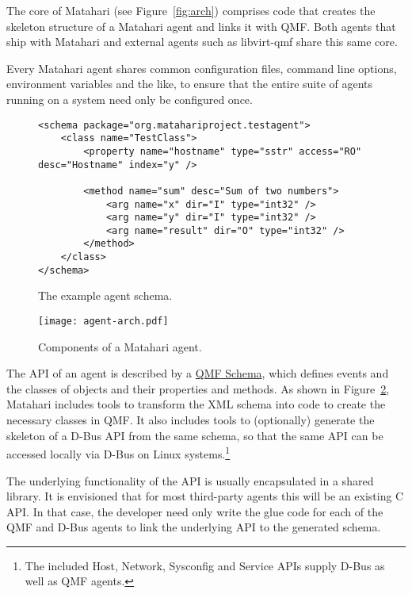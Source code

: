 \documentclass{tufte-handout}
\begin{document}
The core of Matahari (see Figure~\ref{fig:arch}) comprises code that creates the skeleton structure of a Matahari agent and links it with QMF. Both agents that ship with Matahari and external agents such as libvirt-qmf share this same core.

Every Matahari agent shares common configuration files, command line options, environment variables and the like, to ensure that the entire suite of agents running on a system need only be configured once.

\begin{figure}[h]
\begin{Verbatim}
<schema package="org.matahariproject.testagent">
    <class name="TestClass">
        <property name="hostname" type="sstr" access="RO" desc="Hostname" index="y" />

        <method name="sum" desc="Sum of two numbers">
            <arg name="x" dir="I" type="int32" />
            <arg name="y" dir="I" type="int32" />
            <arg name="result" dir="O" type="int32" />
        </method>
    </class>
</schema>
\end{Verbatim}
\caption{The example agent schema.}
\label{fig:schema}
\end{figure}

\begin{figure}[hbt]
\texttt{[image: agent-arch.pdf]}
\caption{Components of a Matahari agent.}
\label{fig:agent-arch}
\end{figure}

The API of an agent is described by a \href{https://cwiki.apache.org/qpid/qpid-management-framework.html#QpidManagementFramework-Schema}{QMF Schema}, which defines events and the classes of objects and their properties and methods. As shown in Figure~\ref{fig:agent-arch}, Matahari includes tools to transform the XML schema into code to create the necessary classes in QMF.
It also includes tools to (optionally) generate the skeleton of a D-Bus API from the same schema, so that the same API can be accessed locally via D-Bus on Linux systems.\footnote{The included Host, Network, Sysconfig and Service APIs supply D-Bus as well as QMF agents.}

The underlying functionality of the API is usually encapsulated in a shared library. It is envisioned that for most third-party agents this will be an existing C API. In that case, the developer need only write the glue code for each of the QMF and D-Bus agents to link the underlying API to the generated schema.
\end{document}
